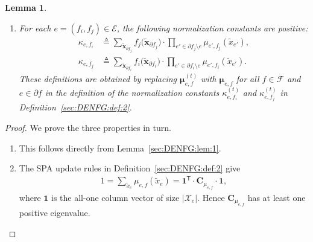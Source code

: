 \documentclass[journal]{IEEEtran}
\newcommand{\add}[1]{{\color{black}#1}}
\newtheorem{lemma}[theorem]{Lemma}
\newcommand{\vect}[1]{ \bm{#1} }
\newcommand{\setEfull}{ \mathcal{E} }
\newcommand{\setF}{ \mathcal{F} }
\newcommand{\setpf}{ \partial f }
\newcommand{\tran}{\mathsf{T}}
\newcommand{\setxe}{ \mathcal{X}_{e} }
\newcommand{\vmu}{ \vect{ \mu } }
\newcommand{\defeq}{ \triangleq }
\newcommand{\etof}{ e,f }
\newcommand{\matr}[1]{\vect{#1}}
\newcommand{\epfi}{ e',f_i }
\newcommand{\epfj}{ e',f_j }
\newcommand{\setpfi}{ \partial f_{i} }
\newcommand{\setpfj}{ \partial f_{j} }
\newcommand{\tx}{ \tilde{x} }
\newcommand{\txe}{ \tilde{x}_{e} }
\newcommand{\tvx}{ \tilde{\vect{x}}  }
\begin{document}
\begin{appendices}
\begin{lemma}
\begin{enumerate}
      \item For each $ e = (f_{i}, f_{j}) \in \setEfull $,
            the following normalization constants are positive:
            \begin{align*}
              \kappa_{e,f_{i}}
               & \defeq
              \sum_{\tvx_{\setpfj}}
              f_{j}\bigl( \tvx_{\setpfj} \bigr)
              \cdot \prod_{e' \in \setpfj \setminus e}
              \mu_{\epfj}(\tx_{e'}), \nonumber \\
              \kappa_{e,f_{j}}
               & \defeq
              \sum_{\tvx_{\setpfi}}
              f_{i}\bigl( \tvx_{\setpfi} \bigr)
              \cdot \prod_{e' \in \setpfi \setminus e}
              \mu_{\epfi}(\tx_{e'}).
            \end{align*}
            These definitions are obtained by replacing
            $ \vmu_{\etof}^{(t)} $ with $ \vmu_{\etof} $ for all
            $ f \in \setF $ and $ e \in \setpf $ in the definition of the normalization constants
            $ \kappa_{e,f_{i}}^{(t)} $ and $ \kappa_{e,f_{j}}^{(t)} $
            in Definition~\ref{sec:DENFG:def:2}.

    \end{enumerate}
  \end{lemma}
  \begin{proof}
    We prove the three properties in turn.
    \begin{enumerate}
      \item \add{This follows directly from Lemma~\ref{sec:DENFG:lem:1}.}

      \item \add{The SPA update rules in Definition~\ref{sec:DENFG:def:2} give}
            \begin{align*}
              1 = \sum_{ \txe } \mu_{\etof}(\txe)
              = \bm{1}^{\tran} \cdot \matr{C}_{\mu_{e,f}} \cdot \bm{1},
            \end{align*}
            where $ \bm{1} $ is the all-one column vector of size $ |\setxe| $.
            \add{Hence $ \matr{C}_{\mu_{\etof}} $ has at least one positive eigenvalue.}


\end{enumerate}
\end{proof}
\end{appendices}
\end{document}
